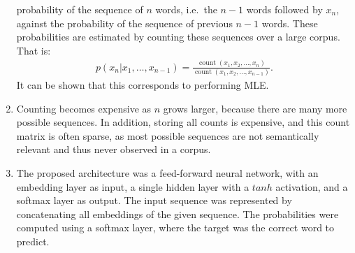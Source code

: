 \documentclass[11pt,a4paper]{article}
\begin{document}
\begin{enumerate}[label=(\alph*)]
          probability of the sequence of $n$ words, i.e.\ the $n-1$ words
          followed by $x_n$, against the probability of the sequence of previous
          $n-1$ words.
          These probabilities are estimated by counting these sequences over a
          large corpus.
          That is:
          \begin{align*}
              p(x_n|x_1,\ldots,x_{n-1}) = \frac{\operatorname{count}(x_1,x_2,\ldots,x_n)}{\operatorname{count}(x_1,x_2,\ldots,x_{n-1})}.
          \end{align*}
          It can be shown that this corresponds to performing MLE.
    \item Counting becomes expensive as $n$ grows larger, because there are many
          more possible sequences. In addition, storing all counts is expensive,
          and this count matrix is often sparse, as most possible sequences are
          not semantically relevant and thus never observed in a corpus.
    \item The proposed architecture was a feed-forward neural network, with an
          embedding layer as input, a single hidden layer with a $tanh$
          activation, and a softmax layer as output.
          The input sequence was represented by concatenating all embeddings of
          the given sequence. The probabilities were computed using a softmax
          layer, where the target was the correct word to predict.


\end{enumerate}
\end{document}
